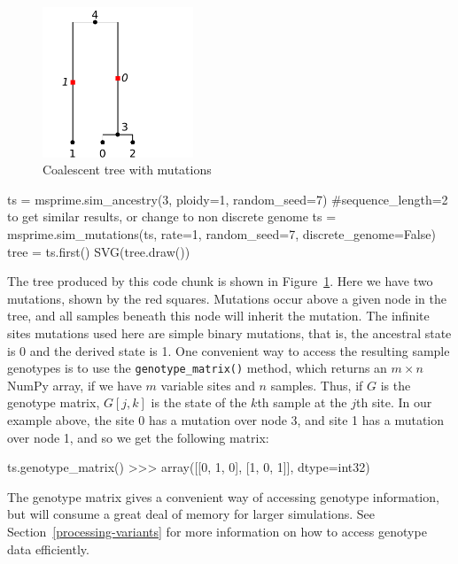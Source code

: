 \documentclass[graybox]{svmult}
\begin{document}
\begin{figure}[t]
\begin{center}
\includegraphics[width=0.4\textwidth]{images/plot_2.pdf}
\end{center}
\caption{\label{fig-tree-mutations} Coalescent tree with mutations}
\end{figure}

\begin{pythoncode}
ts = msprime.sim_ancestry(3, ploidy=1, random_seed=7) #sequence_length=2 to get similar results, or change to non discrete genome
ts = msprime.sim_mutations(ts, rate=1, random_seed=7, discrete_genome=False)
tree = ts.first()
SVG(tree.draw())
\end{pythoncode}

The tree produced by this code chunk is shown in
Figure~\ref{fig-tree-mutations}. Here we have two mutations, shown by the red squares.
Mutations occur above a given node in the tree, and all samples beneath
this node will inherit the mutation. The infinite sites mutations used
here are simple binary mutations, that is, the ancestral state is 0 and
the derived state is 1. One convenient way to access the resulting
sample genotypes is to use the \texttt{genotype\_matrix()} method, which
returns an \(m \times n\) NumPy array, if we have \(m\) variable sites
and \(n\) samples. Thus, if \(G\) is the genotype matrix, \(G[j, k]\) is
the state of the \(k\)th sample at the \(j\)th site. In our example
above, the site 0 has a mutation over node 3, and site 1 has a mutation
over node 1, and so we get the following matrix:

\begin{pythoncode}
ts.genotype_matrix()
>>> array([[0, 1, 0],
           [1, 0, 1]], dtype=int32)
\end{pythoncode}

    The genotype matrix gives a convenient way of accessing genotype
information, but will consume a great deal of memory for larger
simulations. See Section~\ref{processing-variants} for more information
on how to access genotype data efficiently.
\end{document}
